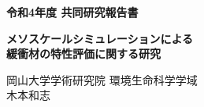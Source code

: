 ﻿\documentclass[11pt,a4j]{jarticle}
\newlength{\minitwocolumn}
\begin{document}
\newcommand{\fat}[1]{\mbox{\boldmath $#1$}}
\newcommand{\D}{\partial}
\newcommand{\w}{\omega}
\newcommand{\ga}{\alpha}
\newcommand{\gb}{\beta}
\newcommand{\gx}{\xi}
\newcommand{\gz}{\zeta}
\newcommand{\vhat}[1]{\hat{\fat{#1}}}
\newcommand{\spc}{\vspace{0.7\baselineskip}}
\newcommand{\halfspc}{\vspace{0.3\baselineskip}}

\newcommand{\twofig}[2]
 {
   \begin{figure}[h]
     \begin{minipage}[t]{\minitwocolumn}
         \begin{center}   #1
         \end{center}
     \end{minipage}
         \hspace{\columnsep}
     \begin{minipage}[t]{\minitwocolumn}
         \begin{center} #2
         \end{center}
     \end{minipage}
   \end{figure}
 }
\begin{center}
{\Large \bf 令和4年度 共同研究報告書}
\end{center}
\vspace{2mm}
\begin{center}
{\LARGE \bf 
メソスケールシミュレーションによる\\緩衝材の特性評価に関する研究} 
\end{center}
\begin{center}
岡山大学学術研究院 環境生命科学学域\\
木本和志
\end{center}
\vspace{10mm}
	


\end{document}
